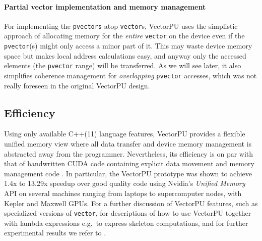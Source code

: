 \paragraph{Partial vector implementation and memory management}
For implementing the \texttt{pvectors} atop \texttt{vector}s, 
VectorPU uses the simplistic approach of allocating memory for
the \emph{entire} \texttt{vector} on the device 
even if the \texttt{pvector}(s) might only
access a minor part of it. This may waste device memory space 
but makes local address calculations easy, and anyway only
the accessed elements (the \texttt{pvector} range) will be transferred.
As we will see later, it also simplifies coherence management
for \emph{overlapping} \texttt{pvector} accesses, which was not 
really foreseen 	in the original VectorPU design.


\subsection{Efficiency}

Using only available C++(11) language features, 
VectorPU provides a flexible unified memory
view where all data transfer and device memory management
is abstracted away from the programmer. Nevertheless,
its efficiency is on par with that of handwritten CUDA code
containing explicit data movement and memory management code
\cite{VectorPU-2017}.
In particular, the VectorPU prototype was shown to
achieve 1.4x to 13.29x speedup over good quality
code using Nvidia's \textit{Unified Memory} API
on several machines ranging from laptops to supercomputer nodes,
with Kepler and Maxwell GPUs. For a further discussion of
VectorPU features, such as
specialized versions of \verb-vector-, for descriptions
of how to use VectorPU together with lambda expressions 
e.g.\ to express skeleton computations, and for further
experimental results 
we refer to \cite{VectorPU-2017}.
